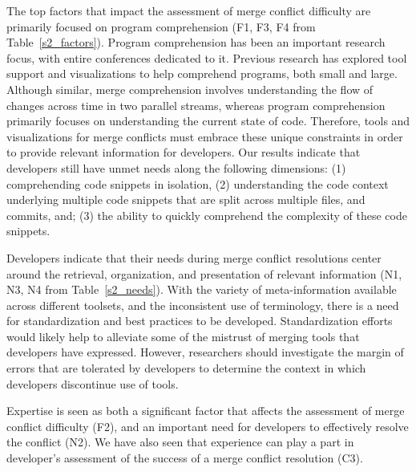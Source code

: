 The top factors that impact the assessment of merge conflict difficulty are primarily focused on program comprehension (F1, F3, F4 from Table~\ref{s2_factors}).
Program comprehension has been an important research focus, with entire conferences dedicated to it.
Previous research has explored tool support and visualizations to help comprehend programs, both small and large.
Although similar, merge comprehension involves understanding the flow of changes across time in two parallel streams, whereas program comprehension primarily focuses on understanding the current state of code.
Therefore, tools and visualizations for merge conflicts must embrace these unique constraints in order to provide relevant information for developers.
Our results indicate that developers still have unmet needs along the following dimensions: (1) comprehending code snippets in isolation, (2) understanding the code context underlying multiple code snippets that are split across multiple files, and commits, and; (3) the ability to quickly comprehend the complexity of these code snippets. 


Developers indicate that their needs during merge conflict resolutions center around the retrieval, organization, and presentation of relevant information (N1, N3, N4 from Table~\ref{s2_needs}).
With the variety of meta-information available across different toolsets, and the inconsistent use of terminology, there is a need for standardization and best practices to be developed.
Standardization efforts would likely help to alleviate some of the mistrust of merging tools that developers have expressed.
However, researchers should investigate the margin of errors that are tolerated by developers to determine the context in which developers discontinue use of tools.

Expertise is seen as both a significant factor that affects the assessment of merge conflict difficulty (F2), and an important need for developers to effectively resolve the conflict (N2).
We have also seen that experience can play a part in developer's assessment of the success of a merge conflict resolution (C3).

